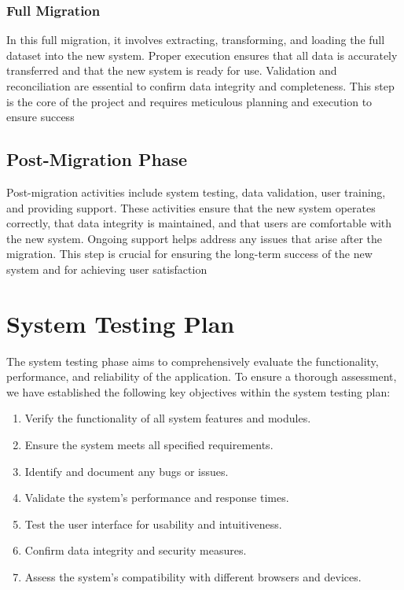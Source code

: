         \subsubsection{Full Migration}
            In this full migration, it involves extracting, transforming, and loading the full dataset into the new system. Proper execution ensures that all data is accurately transferred and that the new system is ready for use. Validation and reconciliation are essential to confirm data integrity and completeness. This step is the core of the project and requires meticulous planning and execution to ensure success

    \subsection{Post-Migration Phase}
        Post-migration activities include system testing, data validation, user training, and providing support. These activities ensure that the new system operates correctly, that data integrity is maintained, and that users are comfortable with the new system. Ongoing support helps address any issues that arise after the migration. This step is crucial for ensuring the long-term success of the new system and for achieving user satisfaction
    
\section{System Testing Plan}

    The system testing phase aims to comprehensively evaluate the functionality, performance, and reliability of the application. To ensure a thorough assessment, we have established the following key objectives within the system testing plan:
    
    \begin{enumerate}
        \item Verify the functionality of all system features and modules.
        \item Ensure the system meets all specified requirements.
        \item Identify and document any bugs or issues.
        \item Validate the system's performance and response times.
        \item Test the user interface for usability and intuitiveness.
        \item Confirm data integrity and security measures.
        \item Assess the system's compatibility with different browsers and devices.
    \end{enumerate}

